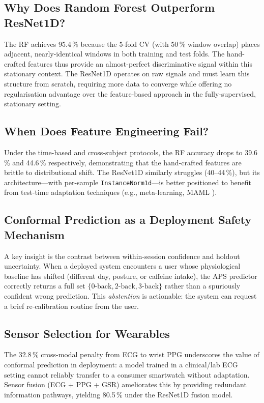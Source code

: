\documentclass[conference]{IEEEtran}
\begin{document}
\subsection{Why Does Random Forest Outperform ResNet1D?}

The RF achieves 95.4\,\% because the 5-fold CV (with 50\,\% window overlap) places adjacent, nearly-identical windows in both training and test folds. The hand-crafted features thus provide an almost-perfect discriminative signal within this stationary context. The ResNet1D operates on raw signals and must learn this structure from scratch, requiring more data to converge while offering no regularisation advantage over the feature-based approach in the fully-supervised, stationary setting.

\subsection{When Does Feature Engineering Fail?}

Under the time-based and cross-subject protocols, the RF accuracy drops to 39.6\,\% and 44.6\,\% respectively, demonstrating that the hand-crafted features are brittle to distributional shift. The ResNet1D similarly struggles (40--44\,\%), but its architecture---with per-sample \texttt{InstanceNorm1d}---is better positioned to benefit from test-time adaptation techniques (e.g., meta-learning, MAML \cite{finn2017model}).

\subsection{Conformal Prediction as a Deployment Safety Mechanism}

A key insight is the contrast between within-session confidence and holdout uncertainty. When a deployed system encounters a user whose physiological baseline has shifted (different day, posture, or caffeine intake), the APS predictor correctly returns a full set $\{0\text{-back}, 2\text{-back}, 3\text{-back}\}$ rather than a spuriously confident wrong prediction. This \emph{abstention} is actionable: the system can request a brief re-calibration routine from the user.

\subsection{Sensor Selection for Wearables}

The 32.8\,\% cross-modal penalty from ECG to wrist PPG underscores the value of conformal prediction in deployment: a model trained in a clinical/lab ECG setting cannot reliably transfer to a consumer smartwatch without adaptation. Sensor fusion (ECG + PPG + GSR) ameliorates this by providing redundant information pathways, yielding 80.5\,\% under the ResNet1D fusion model.
\end{document}
